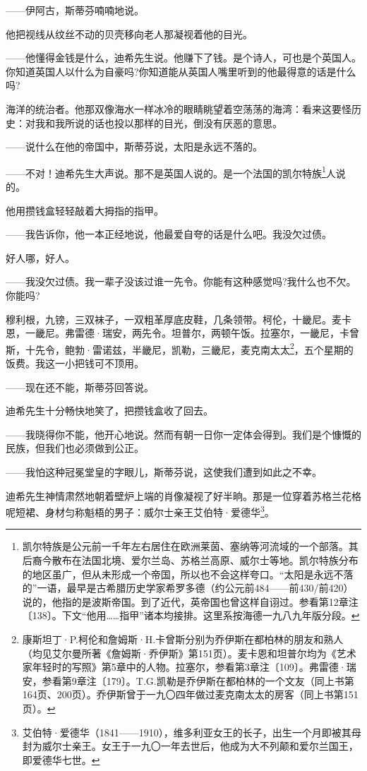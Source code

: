 \par ——伊阿古，斯蒂芬喃喃地说。
\par 他把视线从纹丝不动的贝壳移向老人那凝视着他的目光。
\par ——他懂得金钱是什么，迪希先生说。他赚下了钱。是个诗人，可也是个英国人。你知道英国人以什么为自豪吗?你知道能从英国人嘴里听到的他最得意的话是什么吗?
\par 海洋的统治者。他那双像海水一样冰冷的眼睛眺望着空荡荡的海湾：看来这要怪历史：对我和我所说的话也投以那样的目光，倒没有厌恶的意思。
\par ——说什么在他的帝国中，斯蒂芬说，太阳是永远不落的。
\par ——不对！迪希先生大声说。那不是英国人说的。是一个法国的凯尔特族\footnote{凯尔特族是公元前一千年左右居住在欧洲莱茵、塞纳等河流域的一个部落。其后裔今散布在法国北境、爱尔兰岛、苏格兰高原、威尔士等地。凯尔特族分布的地区虽广，但从未形成一个帝国，所以也不会这样夸口。“太阳是永远不落的”一语，最早是古希腊历史学家希罗多德（约公元前484——前430/前420）说的，他指的是波斯帝国。到了近代，英帝国也曾这样自诩过。参看第12章注〔138〕。下文“他用……指甲”诸本均接排。这里系按海德一九八九年版分段。}人说的。
\par 他用攒钱盒轻轻敲着大拇指的指甲。
\par ——我告诉你，他一本正经地说，他最爱自夸的话是什么吧。我没欠过债。
\par 好人哪，好人。
\par ——我没欠过债。我一辈子没该过谁一先令。你能有这种感觉吗?我什么也不欠。你能吗?
\par 穆利根，九镑，三双袜子，一双粗革厚底皮鞋，几条领带。柯伦，十畿尼。麦卡恩，一畿尼。弗雷德·瑞安，两先令。坦普尔，两顿午饭。拉塞尔，一畿尼，卡曾斯，十先令，鲍勃·雷诺兹，半畿尼，凯勒，三畿尼，麦克南太太\footnote{康斯坦丁·P.柯伦和詹姆斯·H.卡曾斯分别为乔伊斯在都柏林的朋友和熟人（均见艾尔曼所著《詹姆斯·乔伊斯》第151页）。麦卡恩和坦普尔均为《艺术家年轻时的写照》第5章中的人物。拉塞尔，参看第3章注〔109〕。弗雷德·瑞安，参看第9章注〔179〕。T.G.凯勒是乔伊斯在都柏林的一个文友（同上书第164页、200页）。乔伊斯曾于一九〇四年做过麦克南太太的房客（同上书第151页）。}，五个星期的饭费。我这一小把钱可不顶用。
\par ——现在还不能，斯蒂芬回答说。
\par 迪希先生十分畅快地笑了，把攒钱盒收了回去。
\par ——我晓得你不能，他开心地说。然而有朝一日你一定体会得到。我们是个慷慨的民族，但我们也必须做到公正。
\par ——我怕这种冠冕堂皇的字眼儿，斯蒂芬说，这使我们遭到如此之不幸。
\par 迪希先生神情肃然地朝着壁炉上端的肖像凝视了好半晌。那是一位穿着苏格兰花格呢短裙、身材匀称魁梧的男子：威尔士亲王艾伯特·爱德华\footnote{艾伯特·爱德华（1841——1910），维多利亚女王的长子，出生一个月即被其母封为威尔士亲王。女王于一九〇一年去世后，他成为大不列颠和爱尔兰国王，即爱德华七世。}。
